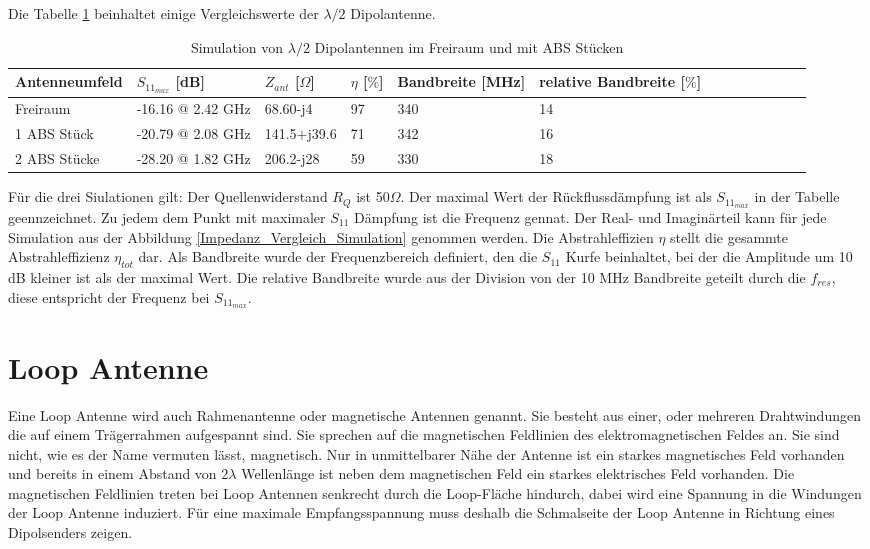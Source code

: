 Die Tabelle \ref{tab:Evaluation_Vergeich_Dipolantennen} beinhaltet einige Vergleichswerte der $\lambda/2$ Dipolantenne.
\begin{table}[!h]
  \centering
  \begin{tabular}{p{3cm} p{4cm} p{2cm} p{1.5cm} p{2cm} p{2.5cm}  l  c c c c p r} 
  \toprule 
  Antenneumfeld             & $S_{11_{max}}$ [dB]		& $Z_{ant}$ [$\Omega$] 	& $\eta$ [$\%$] & Bandbreite [MHz] & relative Bandbreite  [$\%$]\\ 
  \midrule
 Freiraum    			&	-16.16 @ 2.42 GHz		&  	68.60-j4			&   	97	&	340 & 14\\         		
1 ABS Stück  	&   -20.79 @ 2.08 GHz 		&	141.5+j39.6		&	71	&	342	 & 16 \\
2 ABS Stücke  	&   -28.20 @ 1.82 GHz   	&	206.2-j28		&	59	&	330	 & 18 \\
 \bottomrule
  \end{tabular}
  \caption{Simulation von $\lambda/2$ Dipolantennen im Freiraum und mit ABS Stücken}
  \label{tab:Evaluation_Vergeich_Dipolantennen}
\end{table}

Für die drei Siulationen gilt:
Der Quellenwiderstand $R_Q$ ist 50$\Omega$. Der maximal Wert der Rückflussdämpfung ist als $S_{11_{max}}$ in der Tabelle geennzeichnet. Zu jedem dem Punkt mit maximaler $S_{11}$ Dämpfung ist die Frequenz gennat. Der Real- und Imaginärteil kann für jede Simulation aus der Abbildung \ref{Impedanz_Vergleich_Simulation} genommen werden. Die Abstrahleffizien $\eta$ stellt die gesammte Abstrahleffizienz $\eta_{tot}$ dar. Als Bandbreite wurde der Frequenzbereich definiert, den die $S_11$ Kurfe beinhaltet, bei der die Amplitude um 10 dB kleiner ist als der maximal Wert. Die relative Bandbreite wurde aus der Division von der 10 MHz Bandbreite geteilt durch die $f_{res}$, diese entspricht der Frequenz bei $S_{11_{max}}$.

\newpage
\section{Loop Antenne}
Eine Loop Antenne wird  auch Rahmenantenne oder magnetische Antennen genannt. Sie besteht aus einer, oder mehreren Drahtwindungen die auf einem Trägerrahmen aufgespannt sind. Sie sprechen auf die magnetischen Feldlinien des elektromagnetischen Feldes an. Sie sind nicht, wie es der Name vermuten lässt, magnetisch. Nur in unmittelbarer Nähe der Antenne ist ein starkes magnetisches Feld vorhanden und bereits in einem Abstand von $2\lambda$ Wellenlänge ist neben dem magnetischen Feld ein starkes elektrisches Feld vorhanden. Die magnetischen Feldlinien treten bei Loop Antennen senkrecht durch die Loop-Fläche hindurch, dabei wird eine Spannung in die Windungen der Loop Antenne induziert. Für eine maximale Empfangsspannung muss deshalb die Schmalseite der Loop Antenne in Richtung eines Dipolsenders zeigen.


